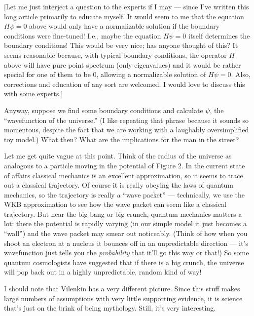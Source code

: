 \documentclass{article}
\def\tightlist{}
\renewcommand{\texttt}[1]{%
  \begingroup
  \ttfamily
  \begingroup\lccode`~=`/\lowercase{\endgroup\def~}{/\discretionary{}{}{}}%
  \begingroup\lccode`~=`[\lowercase{\endgroup\def~}{[\discretionary{}{}{}}%
  \begingroup\lccode`~=`.\lowercase{\endgroup\def~}{.\discretionary{}{}{}}%
  \catcode`/=\active\catcode`[=\active\catcode`.=\active
  \scantokens{#1\noexpand}%
  \endgroup
}
\begin{document}
{[}Let me just interject a question to the experts if I may --- since
I've written this long article primarily to educate myself. It would
seem to me that the equation \(H \psi = 0\) above would only have a
normalizable solution if the boundary conditions were fine-tuned! I.e.,
maybe the equation \(H \psi = 0\) itself determines the boundary
conditions! This would be very nice; has anyone thought of this? It
seems reasonable because, with typical boundary conditions, the operator
\(H\) above will have pure point spectrum (only eigenvalues) and it
would be rather special for one of them to be \(0\), allowing a
normalizable solution of \(H \psi = 0\). Also, corrections and education
of any sort are welcomed. I would love to discuss this with some
experts.{]}

Anyway, suppose we find some boundary conditions and calculate \(\psi\),
the ``wavefunction of the universe.'' (I like repeating that phrase
because it sounds so momentous, despite the fact that we are working
with a laughably oversimplified toy model.) What then? What are the
implications for the man in the street?

Let me get quite vague at this point. Think of the radius of the
universe as analogous to a particle moving in the potential of Figure 2.
In the current state of affairs classical mechanics is an excellent
approximation, so it seems to trace out a classical trajectory. Of
course it is really obeying the laws of quantum mechanics, so the
trajectory is really a ``wave packet'' --- technically, we use the WKB
approximation to see how the wave packet can seem like a classical
trajectory. But near the big bang or big crunch, quantum mechanics
matters a lot: there the potential is rapidly varying (in our simple
model it just becomes a ``wall'') and the wave packet may smear out
noticeably. (Think of how when you shoot an electron at a nucleus it
bounces off in an unpredictable direction --- it's wavefunction just
tells you the \emph{probability} that it'll go this way or that!) So
some quantum cosmologists have suggested that if there is a big crunch,
the universe will pop back out in a highly unpredictable, random kind of
way!

I should note that Vilenkin has a very different picture. Since this
stuff makes large numbers of assumptions with very little supporting
evidence, it is science that's just on the brink of being mythology.
Still, it's very interesting.

\end{document}
